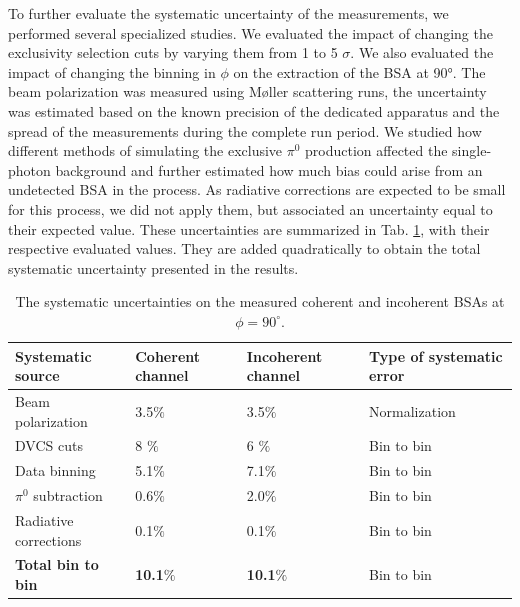 \documentclass[aps,prc,preprint,superscriptaddress]{revtex4}
\begin{document}
To further evaluate the systematic uncertainty of the measurements, we performed several specialized studies. We 
evaluated the impact of changing the exclusivity selection cuts by varying them from 1 to 5 $\sigma$. 
We also evaluated the impact of changing the binning in $\phi$ on the extraction of the BSA
at 90°. The beam polarization was measured using M\o{}ller scattering runs, the uncertainty was 
estimated based on the known precision of the dedicated apparatus and the spread 
of the measurements during the complete run period. We studied how different methods of
simulating the exclusive $\pi^0$ production affected the single-photon background and
further estimated how much bias could arise from an undetected BSA in the process. As 
radiative corrections are expected to be small
for this process, we did not apply them, but associated an uncertainty equal to their expected value.
These uncertainties are summarized in Tab. \ref{Table:systematic_uncertainties}, with their respective 
evaluated values. They are added quadratically to obtain the total systematic uncertainty presented in the results.

\begin{table}[tbp]
\begin{center}
	\begin{tabular}{|m{4cm}|m{2cm}<{\centering}|m{2.3cm}<{\centering}|m{3.7cm}<{\centering}|}
\hline
\bf Systematic source & \bf  Coherent channel  & \bf Incoherent channel & \bf Type of systematic 
error\\
\hline
Beam polarization &  3.5$\%$ &  3.5$\%$& Normalization\\
\hline
\hline
DVCS cuts & 8 $\%$ &  6 $\%$ & Bin to bin\\
\hline
Data binning & 5.1$\%$ & 7.1$\%$ & Bin to bin\\
\hline
$\pi^0$ subtraction &  0.6$\%$ &  2.0$\%$ & Bin to bin\\
\hline
Radiative corrections &  0.1$\%$ & 0.1$\%$ & Bin to bin\\
\hline
\hline
\textbf{Total bin to bin} &  \textbf{10.1}$\%$ &   \textbf{10.1}$\%$ & Bin to 
bin\\
\hline
\end{tabular}
\caption{The systematic uncertainties on the measured coherent and incoherent 
BSAs at $\phi = 90^{\circ}$.}
\label{Table:systematic_uncertainties}
\end{center}
\end{table}
\end{document}
